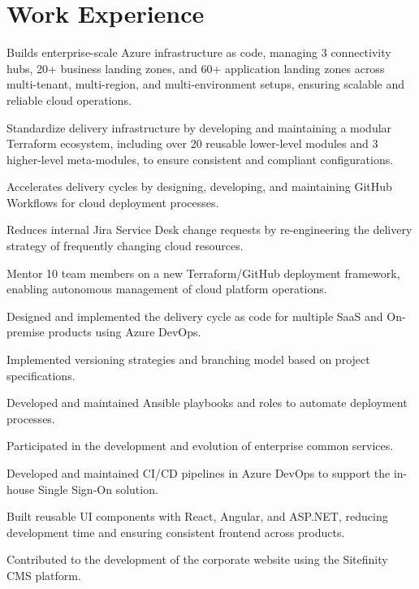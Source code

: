 \documentclass[]{deedy-resume-openfont}
\begin{document}
\section{Work Experience}
\hfill {}
\sectionsepsmall
\begin{tightemize}
	\item Builds enterprise-scale Azure infrastructure as code, managing 3 connectivity hubs, 20+ business landing zones, and 60+ application landing zones across multi-tenant, multi-region, and multi-environment setups, ensuring scalable and reliable cloud operations.
	\item Standardize delivery infrastructure by developing and maintaining a modular Terraform ecosystem, including over 20 reusable lower-level modules and 3 higher-level meta-modules, to ensure consistent and compliant configurations.
	\item Accelerates delivery cycles by designing, developing, and maintaining GitHub Workflows for cloud deployment processes.
	\item Reduces internal Jira Service Desk change requests by re-engineering the delivery strategy of frequently changing cloud resources.
	\item Mentor 10 team members on a new Terraform/GitHub deployment framework, enabling autonomous management of cloud platform operations.
\end{tightemize}
\sectionsep
{}
\sectionsep
{}\hfill {}
\begin{tightemize}
	\item Designed and implemented the delivery cycle as code for multiple SaaS and On-premise products using Azure DevOps.
	\item Implemented versioning strategies and branching model based on project specifications.
	\item Developed and maintained Ansible playbooks and roles to automate deployment processes.
\end{tightemize}
\sectionsep
{}
\sectionsep
{}\hfill {}
\begin{tightemize}
	\item Participated in the development and evolution of enterprise common services.
	\item Developed and maintained CI/CD pipelines in Azure DevOps to support the in-house Single Sign-On solution.
	\item Built reusable UI components with React, Angular, and ASP.NET, reducing development time and ensuring consistent frontend across products.
	\item Contributed to the development of the corporate website using the Sitefinity CMS platform.
\end{tightemize}
\end{document}
